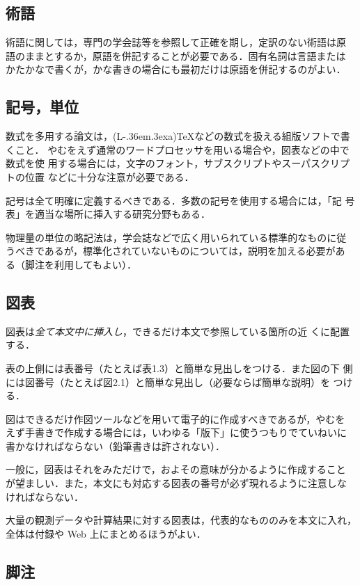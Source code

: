 \documentclass[master]{kuisthesis}		%
\def\LATEX{{\rm (L\kern-.36em\raise.3ex\hbox{\sc a})\TeX}}
\begin{document}
\subsection{術語}
術語に関しては，専門の学会誌等を参照して正確を期し，定訳のない術語は原
語のままとするか，原語を併記することが必要である．固有名詞は言語または
かたかなで書くが，かな書きの場合にも最初だけは原語を併記するのがよい．

\subsection{記号，単位}\label{subsec-symbol}
数式を多用する論文は，\LATEX などの数式を扱える組版ソフトで書くこと．
やむをえず通常のワードプロセッサを用いる場合や，図表などの中で数式を使
用する場合には，文字のフォント，サブスクリプトやスーパスクリプトの位置
などに十分な注意が必要である．

記号は全て明確に定義するべきである．多数の記号を使用する場合には，「記
  号表」を適当な場所に挿入する研究分野もある．

物理量の単位の略記法は，学会誌などで広く用いられている標準的なものに従
うべきであるが，標準化されていないものについては，説明を加える必要があ
る（脚注を利用してもよい）．

\subsection{図表}\label{subsec-figure}
図表は\emph{全て本文中に挿入し}，できるだけ本文で参照している箇所の近
くに配置する．

表の上側には表番号（たとえば表1.3）と簡単な見出しをつける．また図の下
側には図番号（たとえば図2.1）と簡単な見出し（必要ならば簡単な説明）を
つける．

図はできるだけ作図ツールなどを用いて電子的に作成すべきであるが，やむを
えず手書きで作成する場合には，いわゆる「版下」に使うつもりでていねいに
書かなければならない（鉛筆書きは許されない）．

一般に，図表はそれをみただけで，およその意味が分かるように作成すること
が望ましい．また，本文にも対応する図表の番号が必ず現れるように注意しな
ければならない．

大量の観測データや計算結果に対する図表は，代表的なもののみを本文に入れ，
全体は付録や Web 上にまとめるほうがよい．

\subsection{脚注}\label{subsec-footnote}
\end{document}
